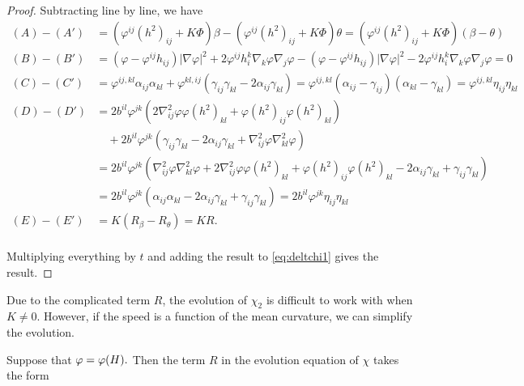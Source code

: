 \documentclass{amsart}
\begin{document}
\begin{proof}
Subtracting line by line, we have
\begin{align*}
(A) - (A') &= \left(\varphi^{ij}(h^2)_{ij} + K\Phi \right)\beta - \left(\varphi^{ij}(h^2)_{ij} + K\Phi \right)\theta = \left(\varphi^{ij}(h^2)_{ij} + K\Phi \right)(\beta - \theta) \\
(B) - (B') &= (\varphi - \varphi^{ij}h_{ij}) |\nabla\varphi|^{2} + 2\varphi^{ij}h^{k}_{i}\nabla_k \varphi \nabla_j \varphi - (\varphi - \varphi^{ij}h_{ij})|\nabla\varphi|^{2} - 2\varphi^{ij}h^{k}_{i}\nabla_k\varphi\nabla_j\varphi = 0 \\
(C) - (C') &= \varphi^{ij,kl} \alpha_{ij} \alpha_{kl} + \varphi^{kl,ij} (\gamma_{ij}\gamma_{kl}  - 2\alpha_{ij} \gamma_{kl}) = \varphi^{ij,kl} (\alpha_{ij} - \gamma_{ij}) (\alpha_{kl} - \gamma_{kl}) = \varphi^{ij,kl} \eta_{ij} \eta_{kl} \\
(D) - (D') &= 2b^{il}\varphi^{jk} (2\nabla^2_{ij}\varphi\varphi(h^2)_{kl} + \varphi(h^2)_{ij}\varphi(h^2)_{kl}) \\
&\quad + 2b^{il} \varphi^{jk} \left(\gamma_{ij} \gamma_{kl} - 2\alpha_{ij} \gamma_{kl} + \nabla^2_{ij}\varphi\nabla^2_{kl}\varphi\right) \\
&= 2b^{il}\varphi^{jk} \left(\nabla^2_{ij}\varphi\nabla^2_{kl}\varphi +2\nabla^2_{ij}\varphi\varphi(h^2)_{kl} + \varphi(h^2)_{ij}\varphi(h^2)_{kl} - 2 \alpha_{ij} \gamma_{kl} + \gamma_{ij} \gamma_{kl} \right) \\
&= 2b^{il}\varphi^{jk} \left(\alpha_{ij}\alpha_{kl} - 2 \alpha_{ij} \gamma_{kl} + \gamma_{ij} \gamma_{kl} \right) = 2b^{il}\varphi^{jk} \eta_{ij} \eta_{kl} \\
(E) - (E') &= K(R_{\beta} - R_{\theta}) = KR.\\
\end{align*}

Multiplying everything by \(t\) and adding the result to \cref{eq:deltchi1} gives the result.
\end{proof}

Due to the complicated term $R$, the evolution of \(\chi_2\) is difficult to work with when $K\ne 0$. However, if the speed is a function of the mean curvature, we can simplify the evolution.

\begin{lemma}\label{RSphere}
Suppose that $\varphi=\varphi(H).$ Then the term $R$ in the evolution equation of $\chi$ takes the form
\end{lemma}
\end{document}
